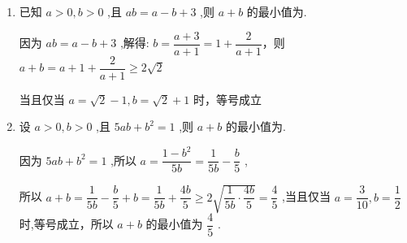 \begin{enumerate}
\begin{jieda}
        当且仅当 $2\left( {x - 1}\right)  = \dfrac{4}{x - 1}$ ,即 $x = 1 + \sqrt{2}$ 时,等号成立，故 ${2x} + y$ 的最小值为 $4\sqrt{2} + 3$
    \end{jieda} 
    \item 已知 $a > 0,b > 0$ ,且 ${ab} = a - b + 3$ ,则 $a + b$ 的最小值为.
    \begin{jieda}
        因为 ${ab} = a - b + 3$ ,解得: $b = \dfrac{a + 3}{a + 1} = 1 + \dfrac{2}{a + 1}$，则 $a + b = a + 1 + \dfrac{2}{a + 1} \geq  2\sqrt{2}$
        
        当且仅当 $a = \sqrt{2} - 1,b = \sqrt{2} + 1$ 时，等号成立
    \end{jieda}
    \item 设 $a > 0,b > 0$ ,且 ${5ab} + {b}^{2} = 1$ ,则 $a + b$ 的最小值为.
    \begin{jieda}
        因为 ${5ab} + {b}^{2} = 1$ ,所以 $a = \dfrac{1 - {b}^{2}}{5b} = \dfrac{1}{5b} - \dfrac{b}{5}$ ,

        所以 $a + b = \dfrac{1}{5b} - \dfrac{b}{5} + b = \dfrac{1}{5b} + \dfrac{4b}{5} \geq  2\sqrt{\dfrac{1}{5b} \cdot  \dfrac{4b}{5}} = \dfrac{4}{5}$ ,当且仅当 $a = \dfrac{3}{10},b = \dfrac{1}{2}$ 时,等号成立，所以 $a + b$ 的最小值为 $\dfrac{4}{5}$ .
    \end{jieda} 
\end{enumerate}
